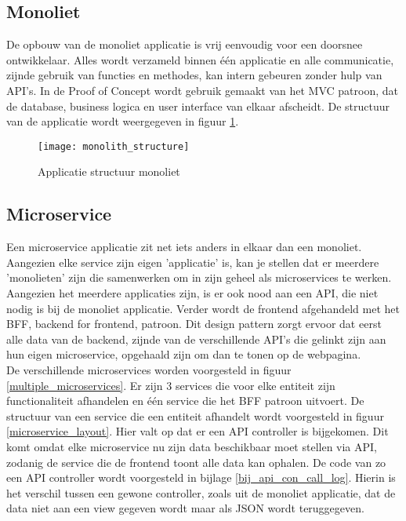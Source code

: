 \subsection{Monoliet}
De opbouw van de monoliet applicatie is vrij eenvoudig voor een doorsnee ontwikkelaar. Alles wordt verzameld binnen één applicatie en alle communicatie, zijnde gebruik van functies en methodes, kan intern gebeuren zonder hulp van API's. In de Proof of Concept wordt gebruik gemaakt van het MVC patroon, dat de database, business logica en user interface van elkaar afscheidt. De structuur van de applicatie wordt weergegeven in figuur \ref{monolith_structure}. \\

\begin{figure}[h!]
    \texttt{[image: monolith\_structure]}
    \caption{Applicatie structuur monoliet}
    \label{monolith_structure}
\end{figure}

\subsection{Microservice}
Een microservice applicatie zit net iets anders in elkaar dan een monoliet. Aangezien elke service zijn eigen 'applicatie' is, kan je stellen dat er meerdere 'monolieten' zijn die samenwerken om in zijn geheel als microservices te werken. Aangezien het meerdere applicaties zijn, is er ook nood aan een API, die niet nodig is bij de monoliet applicatie. Verder wordt de frontend afgehandeld met het BFF, backend for frontend, patroon. Dit design pattern zorgt ervoor dat eerst alle data van de backend, zijnde van de verschillende API's die gelinkt zijn aan hun eigen microservice, opgehaald zijn om dan te tonen op de webpagina. \\

De verschillende microservices worden voorgesteld in figuur \ref{multiple_microservices}. Er zijn 3 services die voor elke entiteit zijn functionaliteit afhandelen en één service die het BFF patroon uitvoert. De structuur van een service die een entiteit afhandelt wordt voorgesteld in figuur \ref{microservice_layout}. Hier valt op dat er een API controller is bijgekomen. Dit komt omdat elke microservice nu zijn data beschikbaar moet stellen via API, zodanig de service die de frontend toont alle data kan ophalen. De code van zo een API controller wordt voorgesteld in bijlage \ref{bij_api_con_call_log}. Hierin is het verschil tussen een gewone controller, zoals uit de monoliet applicatie, dat de data niet aan een view gegeven wordt maar als JSON wordt teruggegeven.\\

